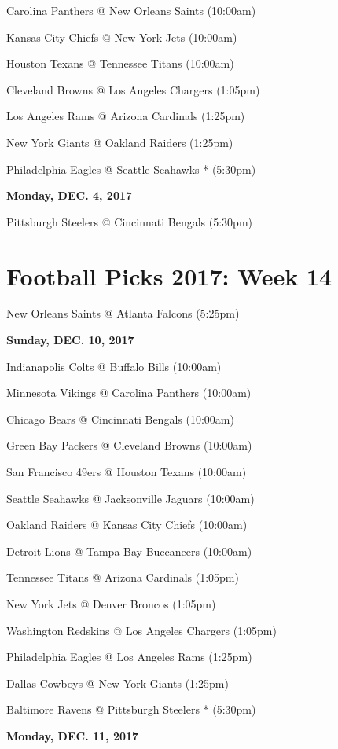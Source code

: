\documentclass[11pt, letterpaper]{article}
\begin{document}
Carolina Panthers @ New Orleans Saints (10:00am)\par
Kansas City Chiefs @ New York Jets (10:00am)\par
Houston Texans @ Tennessee Titans (10:00am)\par
Cleveland Browns @ Los Angeles Chargers (1:05pm)\par
Los Angeles Rams @ Arizona Cardinals (1:25pm)\par
New York Giants @ Oakland Raiders (1:25pm)\par
Philadelphia Eagles @ Seattle Seahawks * (5:30pm)\par
\noindent \normalsize \textbf{Monday, DEC. 4, 2017} \par
Pittsburgh Steelers @ Cincinnati Bengals (5:30pm)\par
\newpage \section*{\LARGE Football Picks 2017: Week 14}
New Orleans    Saints @ Atlanta Falcons (5:25pm)\par
\noindent \normalsize \textbf{Sunday, DEC. 10, 2017} \par
Indianapolis Colts @ Buffalo Bills (10:00am)\par
Minnesota Vikings @ Carolina Panthers (10:00am)\par
Chicago Bears @ Cincinnati Bengals (10:00am)\par
Green Bay Packers @ Cleveland Browns (10:00am)\par
San Francisco 49ers @ Houston Texans (10:00am)\par
Seattle Seahawks @ Jacksonville Jaguars (10:00am)\par
Oakland Raiders @ Kansas City Chiefs (10:00am)\par
Detroit Lions @ Tampa Bay Buccaneers (10:00am)\par
Tennessee Titans @ Arizona Cardinals (1:05pm)\par
New York Jets @ Denver Broncos (1:05pm)\par
Washington Redskins @ Los Angeles Chargers (1:05pm)\par
Philadelphia Eagles @ Los Angeles Rams (1:25pm)\par
Dallas Cowboys @ New York Giants (1:25pm)\par
Baltimore Ravens @ Pittsburgh Steelers * (5:30pm)\par
\noindent \normalsize \textbf{Monday, DEC. 11, 2017} \par
\end{document}
